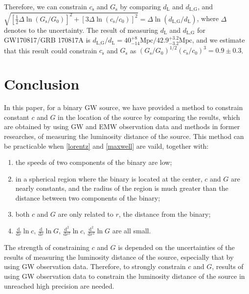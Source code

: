 \documentclass{article}
\def\d{\mathrm{d}}
\begin{document}
Therefore, we can constrain $c_\text{s}$ and $G_\text{s}$ by comparing $d_\text{L}$ and $d_\text{L,G}$, and $\sqrt{[\frac{1}{2}\Delta\!\ln(G_\text{s}/G_0)]^2+[3\Delta\!\ln(c_\text{s}/c_0)]^2}=\Delta\!\ln(d_\text{L,G}/d_\text{L})$, where $\Delta$ denotes to the uncertainty. The result of measuring $d_\text{L}$ and $d_\text{L,G}$ for GW170817/GRB 170817A is $d_\text{L,G}/d_\text{L}=40_{-14}^{+8}\text{Mpc}/42.9_{-3.2}^{+3.2}\text{Mpc}$, and we estimate that this result could constrain $c_\text{s}$ and $G_\text{s}$ as $(G_\text{s}/G_0)^{1/2}(c_\text{s}/c_0)^3=0.9 \pm 0.3$.

\section{Conclusion}

In this paper, for a binary GW source, we have provided a method to constrain constant $c$ and $G$ in the location of the source by comparing the results, which are obtained by using GW and EMW observation data and methods in former researches, of measuring the luminosity distance of the source. This method can be practicable when \eqref{lorentz} and \eqref{maxwell} are vaild, together with:
\begin{enumerate}
    \item the speeds of two components of the binary are low;
    \item in a spherical region where the binary is located at the center, $c$ and $G$ are nearly constants, and the radius of the region is much greater than the distance between two components of the binary;
    \item both $c$ and $G$ are only related to $r$, the distance from the binary;
    \item $\frac{\d}{\d r}\ln c$, $\frac{\d}{\d r}\ln G$, $\frac{\d^2}{\d r^2}\ln c$, $\frac{\d^2}{\d r^2}\ln G$ are all small.
\end{enumerate}
The strength of constraining $c$ and $G$ is depended on the uncertainties of the results of measuring the luminosity distance of the source, especially that by using GW observation data. Therefore, to strongly constrain $c$ and $G$,  results of using GW observation data to constrain the luminosity distance of the source in unreached high precision are needed.
\end{document}
